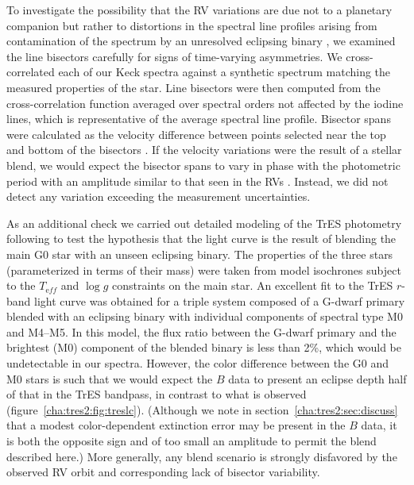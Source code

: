 To investigate the possibility that the RV variations are due not to a
planetary companion but rather to distortions in the spectral line
profiles arising from contamination of the spectrum by an unresolved
eclipsing binary \citep[][]{Santos_Mayor_Naef:aa:2002a,
  Torres_Konacki_Sasselov:apj:2005a}, we examined the line bisectors
carefully for signs of time-varying asymmetries. We cross-correlated
each of our Keck spectra against a synthetic spectrum matching the
measured properties of the star. Line bisectors were then computed
from the cross-correlation function averaged over spectral orders not
affected by the iodine lines, which is representative of the average
spectral line profile.  Bisector spans were calculated as the velocity
difference between points selected near the top and bottom of the
bisectors \citet{Torres_Konacki_Sasselov:apj:2005a}. If the
velocity variations were the result of a stellar blend, we would
expect the bisector spans to vary in phase with the photometric period
with an amplitude similar to that seen in the RVs
\citep{Queloz_Henry_Sivan:aa:2001a, Mandushev_Torres_Latham:apj:2005a}.
 Instead, we did not detect any variation exceeding the measurement uncertainties.

As an additional check we carried out detailed modeling of the TrES
photometry following \citet{Torres_Konacki_Sasselov:apj:2004b} to test
the hypothesis that the light curve is the result of blending the
main G0 star with an unseen eclipsing binary. The properties of the
three stars (parameterized in terms of their mass) were taken from
model isochrones subject to the $T_{\mathrm eff}$ and $\log{g}$
constraints on the main star. An
excellent fit to the TrES $r$-band light curve was obtained for a
triple system composed of a G-dwarf primary blended with an
eclipsing binary with individual components of spectral type M0 and
M4--M5.  In this model, the flux ratio between the G-dwarf primary
and the brightest (M0) component of the blended binary is less than
2\%, which would be undetectable in our spectra.
However, the color difference between the G0 and M0 stars is
such that we would expect the $B$ data to present an eclipse depth
half of that in the TrES bandpass, in contrast to what is observed
(figure~\ref{cha:tres2:fig:treslc}). (Although we note in section~\ref{cha:tres2:sec:discuss}
that a modest color-dependent extinction error may be present in the $B$ data,
it is both the opposite sign and of too small an amplitude to permit the
blend described here.)  More generally, any blend scenario is strongly
disfavored by the observed RV orbit and corresponding lack of bisector
variability.

